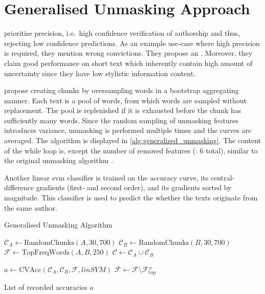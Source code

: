 \section{Generalised Unmasking Approach}
\label{sec:generalized_unmasking_approach}

\citet{bevendorff_generalizing_2019} prioritise precision, 
i.e.\ high confidence verification of authorship and thus, rejecting low confidence predictions.
As an example use-case where high precision is required, they mention wrong convictions.
They propose an . %
Moreover, they claim good performance on short text which inherently contain high amount of uncertainty since they have low stylistic information content.

\citet{bevendorff_generalizing_2019,bevendorff_divergence_based_2020} propose creating chunks by 
oversampling words in a bootstrap aggregating manner. 
Each text is a pool of words, from which words are sampled without replacement.
The pool is replenished if it is exhausted before the chunk has sufficiently many words.
Since the random sampling of unmasking features introduces variance, unmasking is performed multiple times and the curves are averaged.
The algorithm is displayed in \autoref{alg:generalized_unmasking}.
The content of the while loop is, except the number of removed features (\citep{koppel_authorship_2004}: 6 total), 
similar to the original unmasking algorithm \citep{koppel_authorship_2004}.

Another linear \ac{svm} classifier is trained on the accuracy curve, its central-difference gradients (first- and second order), 
and its gradients sorted by magnitude.
This classifier is used to predict the whether the texts originate from the same author.

\begin{algorithm}
    \caption{Generalised Unmasking Algorithm \citep{bevendorff_generalizing_2019,bevendorff_divergence_based_2020}}
    \label{alg:generalized_unmasking}
    \begin{algorithmic}[1]
    
        \State $\mathcal{C}_A \gets \text{RandomChunks}(A, 30, 700)$ 
        \State $\mathcal{C}_B \gets \text{RandomChunks}(B, 30, 700)$
        \State $\mathcal{F} \gets \text{TopFreqWords}(A, B, 250)$
        \State $\mathcal{C} \gets \mathcal{C}_A \cup \mathcal{C}_B$

        
        \State $a \gets \text{CVAcc}(\mathcal{C}_A, \mathcal{C}_B, \mathcal{F}, linSVM)$ 
        \State $\mathcal{F} \gets \mathcal{F} \setminus \mathcal{F}_{\text{top}}^{\pm}$ 
    
        \EndWhile
    
        \State \Return List of recorded accuracies $a$
    \EndProcedure
    \end{algorithmic}
\end{algorithm}

